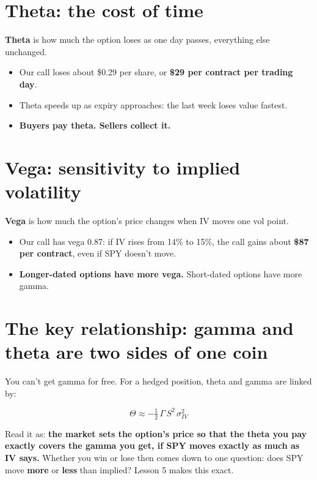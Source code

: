 \documentclass{article}
\begin{document}
\section{Theta: the cost of time}

\textbf{Theta} is how much the option loses as one day passes, everything else unchanged.

\begin{itemize}

\item Our call loses about \$0.29 per share, or \textbf{\$29 per contract per trading day}.

\item Theta speeds up as expiry approaches: the last week loses value fastest.

\item \textbf{Buyers pay theta. Sellers collect it.}

\end{itemize}

\section{Vega: sensitivity to implied volatility}

\textbf{Vega} is how much the option's price changes when IV moves one vol point.

\begin{itemize}

\item Our call has vega 0.87: if IV rises from 14\% to 15\%, the call gains about \textbf{\$87 per contract}, even if SPY doesn't move.

\item \textbf{Longer-dated options have more vega.} Short-dated options have more gamma.

\end{itemize}

\section{The key relationship: gamma and theta are two sides of one coin}

You can't get gamma for free. For a hedged position, theta and gamma are linked by:

\[\Theta \approx -\tfrac{1}{2}\, \Gamma\, S^2\, \sigma_{IV}^2\]

Read it as: \textbf{the market sets the option's price so that the theta you pay exactly covers the gamma you get, if SPY moves exactly as much as IV says.} Whether you win or lose then comes down to one question: does SPY move \textbf{more} or \textbf{less} than implied? Lesson 5 makes this exact.
\end{document}
